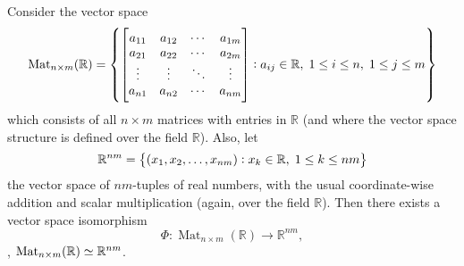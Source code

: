 \documentclass[11pt,openany]{article}
\begin{document}
\newpage
{}
\begin{example*}
	Consider the vector space \[
	\text{Mat}_{n\times m}(\mathbb{R})=\set{\begin{bmatrix}
			a_{11} & a_{12} & \cdots & a_{1m} \\
			a_{21} & a_{22} & \cdots & a_{2m} \\
			\vdots & \vdots & \ddots & \vdots \\
			a_{n1} & a_{n2} & \cdots & a_{nm}
		\end{bmatrix}: a_{ij}\in\mathbb{R},\; 1\leq i\leq n,\; 1\leq j\leq m}
	\] which consists of all \( n \times m \) matrices with entries in \(\mathbb{R}\) (and where the vector space structure is defined over the field \(\mathbb{R}\)). Also, let \[
	\mathbb{R}^{nm}=\set{(x_1,x_2,\dots,x_{nm}):x_k\in \mathbb{R},\; 1\leq k\leq nm}
	\] the vector space of \( nm \)-tuples of real numbers, with the usual coordinate-wise addition and scalar multiplication (again, over the field \(\mathbb{R}\)). Then there exists a vector space isomorphism \[
	\Phi : \operatorname{Mat}_{n \times m}(\mathbb{R}) \to \mathbb{R}^{nm},
	\] \ie, $\text{Mat}_{n\times m}(\mathbb{R})\simeq \mathbb{R}^{nm}$.

\end{example*}
\end{document}
